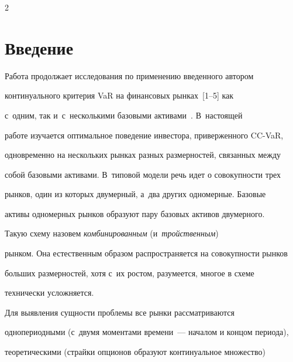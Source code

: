 




\thispagestyle{headings}





\begin{multicols}{2}





\label{st\stat}


  


  \section{Введение}


  


  Работа продолжает исследования по применению введенного автором 


континуального критерия VaR  на финансовых рынках~[1--5] как 


с~одним, так и~с~несколькими базовыми активами~\cite{3-ag}. В~настоящей 


работе изучается оптимальное поведение инвестора, приверженного CC-VaR, 


одновременно на нескольких рынках разных размерностей, связанных между 


собой базовыми активами. В~типовой модели речь идет о совокупности трех 


рынков, один из которых двумерный, а~два других одномерные. Базовые 


активы одномерных рынков образуют пару базовых активов двумерного. 


Такую схему назовем \textit{комбинированным} (и~\textit{тройственным}) 


рынком. Она естественным образом распространяется на совокупности рынков 


больших размерностей, хотя с~их ростом, разумеется, многое в схеме 


технически усложняется.


  


  Для выявления сущности проблемы все рынки рассматриваются 


однопериодными (с~двумя моментами времени~--- началом и концом периода), 


теоретическими (страйки опционов образуют континуальное множество) 



\end{multicols}
